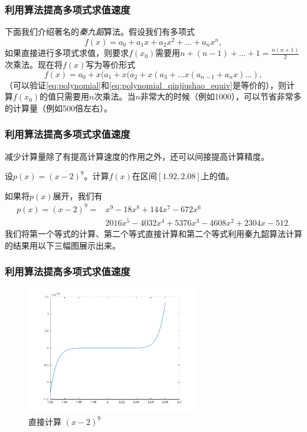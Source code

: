 \documentclass[10pt]{beamer}
\begin{document}
\begin{frame}
\frametitle{利用算法提高多项式求值速度}
下面我们介绍著名的\emph{秦九韶}算法。假设我们有多项式
\begin{equation}
f(x) = a_0 + a_1 x + a_2 x^2 + \ldots + a_n x^n,
\label{eq:polynomial}
\end{equation}
如果直接进行多项式求值，则要求$f(x_0)$需要用$n + (n-1) + \ldots + 1 = \frac{n(n+1)}{2}$次乘法。现在将$f(x)$写为等价形式
\begin{equation}
f(x) = a_0 + x (a_1 + x(a_2 +x ( a_3 +\ldots x(a_{n-1}+ a_n x) \ldots),
\label{eq:polynomial_qinjiushao_equiv}
\end{equation}
（可以验证\eqref{eq:polynomial}和\eqref{eq:polynomial_qinjiushao_equiv}是等价的），则计算$f(x_0)$的值只需要用$n$次乘法。当$n$非常大的时候（例如1000），可以节省非常多的计算量（例如500倍左右）。

\end{frame}

\begin{frame}
\frametitle{利用算法提高多项式求值速度}
减少计算量除了有提高计算速度的作用之外，还可以间接提高计算精度。
\begin{example}
设$p(x) = (x-2)^9$。计算$f(x)$在区间$[1.92,2.08]$上的值。
\end{example}
\begin{solution}
如果将$p(x)$展开，我们有
\begin{align}
p(x) = (x-2)^9 = &x^9 - 18x^8 + 144x^7 - 672x^6 \nonumber \\
                          & 2016x^5 - 4032x^4 + 5376x^3 - 4608x^2 + 2304x -512.
\end{align}
我们将第一个等式的计算、第二个等式直接计算和第二个等式利用秦九韶算法计算的结果用以下三幅图展示出来。
\end{solution}

\end{frame}

\begin{frame}
\frametitle{利用算法提高多项式求值速度}
\begin{figure}
\includegraphics[width=7.5cm]{figs/f_simple.png} 
\caption{直接计算 $(x-2)^9$} 
\end{figure}

\end{frame}
\end{document}

